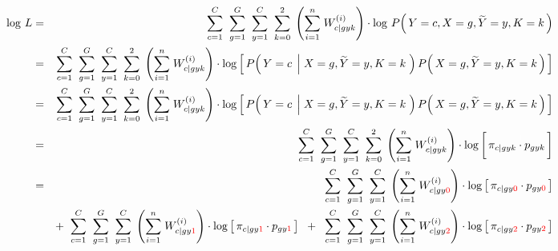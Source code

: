 \vskip 0.3cm
\begin{eqnarray*}
\log\,L &=&
	\overset{C}{\underset{c=1}{\sum}}\;\;
	\overset{G}{\underset{g=1}{\sum}}\;\;
	\overset{C}{\underset{y=1}{\sum}}\;\;
	\overset{2}{\underset{k=0}{\sum}}\;
	\left(\overset{n}{\underset{i=1}{\sum}}\;W^{(i)}_{c \vert gyk}\right)
	\cdot
	\log\,P\!\left(\,Y=c,X=g,\widetilde{Y}=y,K=k\,\right)
\\
&=&
	\overset{C}{\underset{c=1}{\sum}}\;\;
	\overset{G}{\underset{g=1}{\sum}}\;\;
	\overset{C}{\underset{y=1}{\sum}}\;\;
	\overset{2}{\underset{k=0}{\sum}}\;
	\left(\overset{n}{\underset{i=1}{\sum}}\;W^{(i)}_{c \vert gyk}\right)
	\cdot
	\log\left[\,
		P\!\left(\,Y=c\;\left\vert\;X=g,\widetilde{Y}=y,K=k\right.\,\right)
		P\!\left(\,X=g,\widetilde{Y}=y,K=k\,\right)
	\,\right]
\\
&=&
	\overset{C}{\underset{c=1}{\sum}}\;\;
	\overset{G}{\underset{g=1}{\sum}}\;\;
	\overset{C}{\underset{y=1}{\sum}}\;\;
	\overset{2}{\underset{k=0}{\sum}}\;
	\left(\overset{n}{\underset{i=1}{\sum}}\;W^{(i)}_{c \vert gyk}\right)
	\cdot
	\log\left[\,
		P\!\left(\,Y=c\;\left\vert\;X=g,\widetilde{Y}=y,K=k\right.\,\right)
		P\!\left(\,X=g,\widetilde{Y}=y,K=k\,\right)
	\,\right]
\\
&=&
	\overset{C}{\underset{c=1}{\sum}}\;\;
	\overset{G}{\underset{g=1}{\sum}}\;\;
	\overset{C}{\underset{y=1}{\sum}}\;\;
	\overset{2}{\underset{k=0}{\sum}}\;
	\left(\overset{n}{\underset{i=1}{\sum}}\;W^{(i)}_{c \vert gyk}\right)
	\cdot
	\log\left[\,
		\pi_{c \vert gyk} \overset{{\color{white}\vert}}{\cdot} p_{gyk}
	\,\right]
\\
&=&
	\overset{C}{\underset{c=1}{\sum}}\;\;
	\overset{G}{\underset{g=1}{\sum}}\;\;
	\overset{C}{\underset{y=1}{\sum}}\;
	\left(\overset{n}{\underset{i=1}{\sum}}\;W^{(i)}_{c \vert gy{\color{red}0}}\right)
	\cdot
	\log\left[\,
		\pi_{c \vert gy\color{red}0} \cdot p_{gy\color{red}0}
	\,\right]
\\
&&
	+ \;\;
	\overset{C}{\underset{c=1}{\sum}}\;\;
	\overset{G}{\underset{g=1}{\sum}}\;\;
	\overset{C}{\underset{y=1}{\sum}}\;
	\left(\overset{n}{\underset{i=1}{\sum}}\;W^{(i)}_{c \vert gy{\color{red}1}}\right)
	\cdot
	\log\left[\,
		\pi_{c \vert gy\color{red}1} \cdot p_{gy\color{red}1}
	\,\right]
	\;\; + \;\;
	\overset{C}{\underset{c=1}{\sum}}\;\;
	\overset{G}{\underset{g=1}{\sum}}\;\;
	\overset{C}{\underset{y=1}{\sum}}\;
	\left(\overset{n}{\underset{i=1}{\sum}}\;W^{(i)}_{c \vert gy{\color{red}2}}\right)
	\cdot
	\log\left[\,
		\pi_{c \vert gy\color{red}2} \cdot p_{gy\color{red}2}
	\,\right]
\end{eqnarray*}

